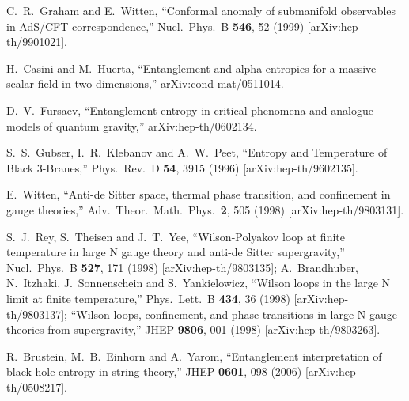 \documentclass[twocolumn,amsmath,amssymb,nofootinbib,eqsecnum,tighten,prd]{revtex4}
\begin{document}
\begin{thebibliography}{99}

 C.~R.~Graham and E.~Witten,
  ``Conformal anomaly of submanifold observables in AdS/CFT correspondence,''
  Nucl.\ Phys.\ B {\bf 546}, 52 (1999)
  [arXiv:hep-th/9901021].


H.~Casini and M.~Huerta,
  ``Entanglement and alpha entropies for a massive scalar field in two
  dimensions,''
  arXiv:cond-mat/0511014.
  
D.~V.~Fursaev,
  ``Entanglement entropy in critical phenomena and analogue models of quantum
  gravity,'' arXiv:hep-th/0602134.

S.~S.~Gubser, I.~R.~Klebanov and A.~W.~Peet,
``Entropy and Temperature of Black 3-Branes,''
 Phys.\ Rev.\ D {\bf 54}, 3915 (1996)
 [arXiv:hep-th/9602135].

 E.~Witten,
  ``Anti-de Sitter space, thermal phase
  transition, and confinement in  gauge
  theories,''
  Adv.\ Theor.\ Math.\ Phys.\  {\bf 2}, 505 (1998)
  [arXiv:hep-th/9803131].



 S.~J.~Rey, S.~Theisen and J.~T.~Yee,
  ``Wilson-Polyakov loop at finite temperature in large N gauge theory and
  anti-de Sitter supergravity,''
  Nucl.\ Phys.\ B {\bf 527}, 171 (1998)
  [arXiv:hep-th/9803135];
A.~Brandhuber, N.~Itzhaki, J.~Sonnenschein and S.~Yankielowicz,
  ``Wilson loops in the large N limit at finite temperature,''
  Phys.\ Lett.\ B {\bf 434}, 36 (1998)
  [arXiv:hep-th/9803137];
   ``Wilson loops, confinement, and phase transitions in large N gauge  theories
  from supergravity,''
  JHEP {\bf 9806}, 001 (1998)
  [arXiv:hep-th/9803263].
  
  R.~Brustein, M.~B.~Einhorn and A.~Yarom,
  ``Entanglement interpretation of black hole entropy in string theory,''
  JHEP {\bf 0601}, 098 (2006)
  [arXiv:hep-th/0508217].
  


\end{thebibliography}




\end{document}
